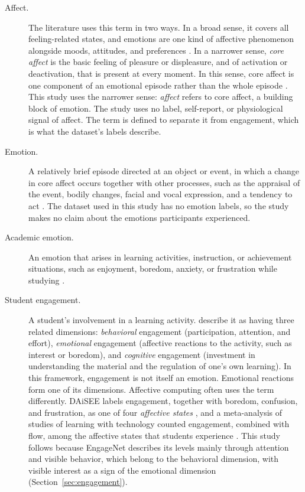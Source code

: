 \begin{description}

   \item[Affect.] The literature uses this term in two ways. In a broad sense, it covers all feeling-related states, and emotions are one kind of affective phenomenon alongside moods, attitudes, and preferences \cite{scherer2005}. In a narrower sense, \emph{core affect} is the basic feeling of pleasure or displeasure, and of activation or deactivation, that is present at every moment. In this sense, core affect is one component of an emotional episode rather than the whole episode \cite{russell2003}. This study uses the narrower sense: \emph{affect} refers to core affect, a building block of emotion. The study uses no label, self-report, or physiological signal of affect. The term is defined to separate it from engagement, which is what the dataset's labels describe.

   \item[Emotion.] A relatively brief episode directed at an object or event, in which a change in core affect occurs together with other processes, such as the appraisal of the event, bodily changes, facial and vocal expression, and a tendency to act \cite{russell2003,scherer2005}. The dataset used in this study has no emotion labels, so the study makes no claim about the emotions participants experienced.

   \item[Academic emotion.] An emotion that arises in learning activities, instruction, or achievement situations, such as enjoyment, boredom, anxiety, or frustration while studying \cite{pekrun2002}.

   \item[Student engagement.] A student's involvement in a learning activity.  describe it as having three related dimensions: \emph{behavioral} engagement (participation, attention, and effort), \emph{emotional} engagement (affective reactions to the activity, such as interest or boredom), and \emph{cognitive} engagement (investment in understanding the material and the regulation of one's own learning). In this framework, engagement is not itself an emotion. Emotional reactions form one of its dimensions. Affective computing often uses the term differently. DAiSEE labels engagement, together with boredom, confusion, and frustration, as one of four \emph{affective states} \cite{gupta2016}, and a meta-analysis of studies of learning with technology counted engagement, combined with flow, among the affective states that students experience \cite{dmello2013}. This study follows  because EngageNet describes its levels mainly through attention and visible behavior, which belong to the behavioral dimension, with visible interest as a sign of the emotional dimension (Section~\ref{sec:engagement}).


\end{description}

